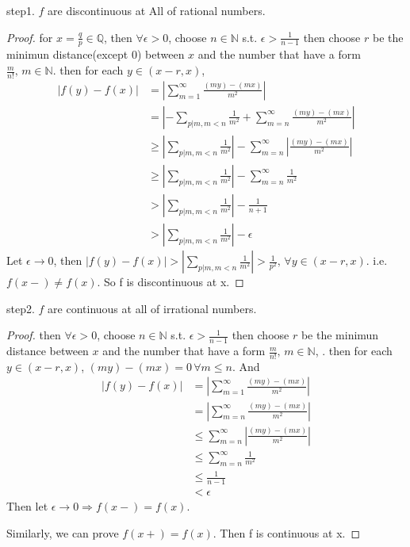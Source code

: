 \documentclass{article}
\begin{document}
step1.   $ f  $ are discontinuous at All of rational numbers.
\begin{proof}
    for  $ x= \frac{q }{p } \in \mathbb{Q }  $, then  $ \forall \epsilon>0 $, choose  $ n\in \mathbb{N } $ s.t.  $ \epsilon>\frac{1 }{n-1} $ 
    then choose  $ r  $ be the minimun distance(except 0) between  $ x $ and the number that have a form  $  \frac{m}{n!},\, m\in \mathbb{N }    $.
    then for each  $ y\in (x-r,x) $,   
    \begin{align*}
        |f(y)-f(x)|&=|\sum\limits_{m=1}^{\infty}  \frac{(my)-(mx)}{m^2}|\\ 
        &=|-\sum\limits_{p|m,m <n } \frac{1}{m^2}+\sum\limits_{m=n}^{\infty}\frac{(my)-(mx)}{m^2}|\\
        &  \geqslant |\sum\limits_{p|m,m <n } \frac{1}{m^2} |-\sum\limits_{m=n}^{\infty}|\frac{(my)-(mx)}{m^2}|\\
        &\geqslant |\sum\limits_{p|m,m <n } \frac{1}{m^2} |-\sum\limits_{m=n }^{\infty  } \frac{1}{m^2}\\
        &>|\sum\limits_{p|m,m <n } \frac{1}{m^2} |- \frac{1}{n+1}\\
        &>|\sum\limits_{p|m,m <n } \frac{1}{m^2} |-\epsilon
    \end{align*}
    Let  $ \epsilon \rightarrow 0 $, then  $ |f(y)-f(x)|>|\sum\limits_{p|m,m <n } \frac{1}{m^2} |>\frac{1}{p^2},\,\forall y\in (x-r,x) $.  
    i.e.  $ f(x-)\neq f(x) $. So f is discontinuous at x.
         
\end{proof}
step2. $ f  $ are continuous at all of irrational numbers.
\begin{proof}
    then  $ \forall \epsilon>0 $, choose  $ n\in \mathbb{N } $ s.t.  $ \epsilon>\frac{1 }{n-1} $ 
    then choose  $ r  $ be the minimun distance between $ x $ and the number that have a form  $  \frac{m}{n!},\, m\in \mathbb{N }    $, .
    then for each  $ y\in (x-r,x) $,  $ (my)-(mx)=0\, \forall m \leqslant n $. And   
    \begin{align*}
        |f(y)-f(x)|&=|\sum\limits_{m=1}^{\infty}  \frac{(my)-(mx)}{m^2}|\\ 
        &=|\sum\limits_{m=n}^{\infty}\frac{(my)-(mx)}{m^2}|\\
        & \leqslant \sum\limits_{m=n}^{\infty}|\frac{(my)-(mx)}{m^2}|\\
        & \leqslant \sum\limits_{m=n }^{\infty  } \frac{1}{m^2}\\
        & \leqslant \frac{1}{n-1}\\
        &<\epsilon
    \end{align*}
    Then let  $ \epsilon\rightarrow 0 \Rightarrow  f(x-)=f(x)$.

    Similarly, we can prove  $ f(x+)=f(x) $. Then f is continuous at x.
\end{proof}
\end{document}
